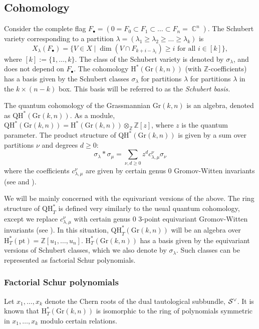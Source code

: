 \documentclass[12pt]{article}
\DeclareMathOperator{\C}{\mathbb{C}}
\newcommand{\bb}[1]{\mathbb{#1}}
\theoremstyle{plain}
\newcommand{\Z}{\mathbb{Z}}
\theoremstyle{definition}
\begin{document}
\subsection{Cohomology}

Consider the complete flag $F_\bullet = (0 = F_0 \subset F_1 \subset \ldots \subset F_n = \C^n)$. The Schubert variety corresponding to a partition $\lambda = (\lambda_1 \geq \lambda_2 \geq \ldots \geq \lambda_k)$ is 
$$
X_\lambda (F_\bullet) = \{ V \in X \mid \dim (V \cap F_{k + i - \lambda_i}) \geq i \text{ for all $i \in [k]$} \},
$$
where $[k] := \{1,\dots, k\}$. The class of the Schubert variety is denoted by $\sigma_\lambda$, and does not depend on $F_\bullet$. The cohomology $\mathrm{H}^* (\mathrm{Gr}(k,n))$ (with $\Z$-coefficients) has a basis given by the Schubert classes $\sigma_\lambda$ for partitions $\lambda$ for partitions $\lambda$ in the $k \times (n-k)$ box. This basis will be referred to as the \emph{Schubert basis.} 


The quantum cohomology of the Grassmannian $\textrm{Gr}(k,n)$ is an algebra, denoted as $\textrm{QH}^*(\textrm{Gr}(k,n))$. As a module, $\textrm{QH}^* (\textrm{Gr}(k,n)) = \textrm{H}^* (\textrm{Gr}(k,n)) \otimes_\Z \Z[z]$, where $z$ is the quantum parameter. The product structure of $\textrm{QH}^*(\textrm{Gr}(k,n))$ is given by a sum over partitions $\nu$ and degrees $d\geq 0$:
\begin{equation}
\label{eqn: quantum relations}
\sigma_\lambda * \sigma_\mu = \sum_{\nu,d \geq 0} z^d c_{\lambda,\mu} ^\nu \sigma_\nu
\end{equation}
where the coefficients $c^\nu_{\lambda, \mu}$ are given by certain genus 0 Gromov-Witten invariants (see \cite{BERTRAM1997289} and \cite{buch2001quantumcohomologygrassmannians}).

We will be mainly concerned with the equivariant versions of the above. The ring structure of $\textrm{QH}^*_T$ is defined very similarly to the usual quantum cohomology, except we replace $c^\nu_{\lambda, \mu}$ with certain genus 0 3-point equivariant Gromov-Witten invariants (see \cite{givental1996equivariantgromovwitten}). In this situation, $\mathrm{QH}_T^* (\mathrm{Gr}(k,n))$ will be an algebra over $\textrm{H}^*_T(\textrm{pt}) = \bb{Z}[u_1,\dots, u_n]$. $\textrm{H}^*_T (\textrm{Gr}(k,n))$ has a basis given by the equivariant versions of Schubert classes, which we also denote by $\sigma_\lambda$. Such classes can be represented as factorial Schur polynomials. 


\subsubsection{Factorial Schur polynomials}
Let $x_1,\dots, x_k$ denote the Chern roots of the dual tautological subbundle, $\cal S^\vee$. It is known that $\textrm{H}^*_T(\textrm{Gr}(k,n))$ is isomorphic to the ring of polynomials symmetric in $x_1,\dots,x_k$ modulo certain relations. 
\end{document}
